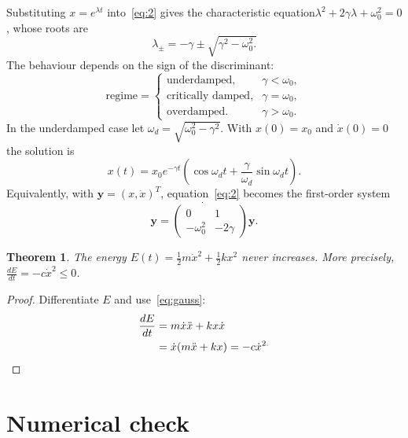 \documentclass[11pt,a4paper]{article}
\newtheorem{theorem}{Theorem}
\begin{document}
Substituting $x=e^{\lambda t}$ into~\eqref{eq:2} gives the characteristic equation$\lambda^{2}+2\gamma\lambda+\omega_{0}^{2}=0$, whose roots are
\begin{equation}
  \lambda_{\pm}=-\gamma\pm\sqrt{\gamma^{2}-\omega_{0}^{2}.}
\end{equation}
The behaviour depends on the sign of the discriminant:
\begin{equation*}
  \text{regime}=\begin{cases}
\text{underdamped,} & \gamma<\omega_{0}, \\
\text{critically damped,} & \gamma=\omega_{0}, \\
\text{overdamped.} & \gamma>\omega_{0}.
\end{cases}
\end{equation*}
In the underdamped case let $\omega_{d}=\sqrt{\omega_{0}^{2}-\gamma^{2}}$. With $x(0)=x_{0}$ and $\dot{x}(0)=0$ the solution is
\begin{equation}
  x(t)=x_{0}e^{-\gamma t}\left( \cos\omega_{d}t+\frac{\gamma}{\omega_{d}}\sin\omega_{d}t \right).
  \label{eq:cos-dsin}
\end{equation}
Equivalently, with $\mathbf{y}=(x,\dot{x})^{T}$, equation~\eqref{eq:2} becomes the first-order system
\begin{equation}
  \dot{\mathbf{y}=\begin{pmatrix}
0 & 1 \\
-\omega_{0}^{2} & -2\gamma
\end{pmatrix}\mathbf{y}.}
\end{equation}

\begin{theorem}
  The energy $E(t)=\frac{1}{2}m\dot{x}^{2}+\frac{1}{2}kx^{2}$ never increases. More precisely, $\frac{dE}{dt}=-c\dot{x}^{2}\leq0$.
\end{theorem}

\begin{proof}
  Differentiate $E$ and use~\eqref{eq:gauss}:
\begin{align*}
  \frac{dE}{dt} &=m\dot{x}\ddot{x}+kx\dot{x} \\
   &=\dot{x}(m\ddot{x}+kx)=-c\dot{x}^{2.} \qedhere
\end{align*}
\end{proof}

\section{Numerical check}
\end{document}
